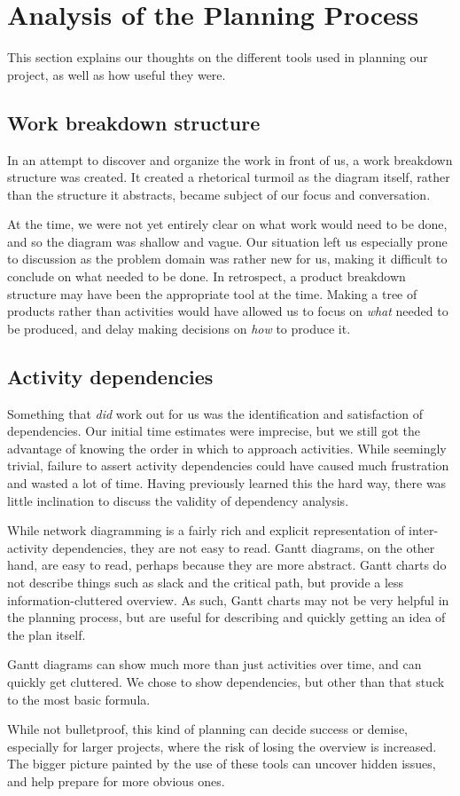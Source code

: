 \section{Analysis of the Planning Process}
\label{sec:AnalysisPlanning}

This section explains our thoughts on the different tools used in planning our
project, as well as how useful they were.

\subsection{Work breakdown structure} In an attempt to discover and organize
the work in front of us, a work breakdown structure was created. It created a
rhetorical turmoil as the diagram itself, rather than the structure it
abstracts, became subject of our focus and conversation.

At the time, we were not yet entirely clear on what work would need to be done,
and so the diagram was shallow and vague. Our situation left us especially
prone to discussion as the problem domain was rather new for us, making it
difficult to conclude on what needed to be done. In retrospect, a product
breakdown structure may have been the appropriate tool at the time. Making a
tree of products rather than activities would have allowed us to focus on
\emph{what} needed to be produced, and delay making decisions on \emph{how} to
produce it\cite[ch.~8.3,~8.4]{caye}.

\subsection{Activity dependencies}
Something that \emph{did} work out for us was the identification and satisfaction
of dependencies. Our initial time estimates were imprecise, but we still got the
advantage of knowing the order in which to approach activities. While seemingly
trivial, failure to assert activity dependencies could have caused much
frustration and wasted a lot of time. Having previously learned this the hard way,
there was little inclination to discuss the validity of dependency analysis.

While network diagramming is a fairly rich and explicit representation of
inter-activity dependencies, they are not easy to read. Gantt
diagrams, on the other hand, are easy to read, perhaps because they are more
abstract. Gantt charts do not describe things such as slack and the critical
path, but provide a less information-cluttered overview. As such, Gantt charts
may not be very helpful in the planning process, but are useful for describing
and quickly getting an idea of the plan itself.

Gantt diagrams can show much more than just activities over time, and can quickly
get cluttered\cite[ch.~8.6]{caye}. We chose to show dependencies, but other than
that stuck to the most basic formula.

While not bulletproof, this kind of planning can decide success or
demise\cite[ch.~8]{caye}, especially for larger projects, where the risk of
losing the overview is increased. The bigger picture painted by the use of
these tools can uncover hidden issues, and help prepare for more obvious ones.
